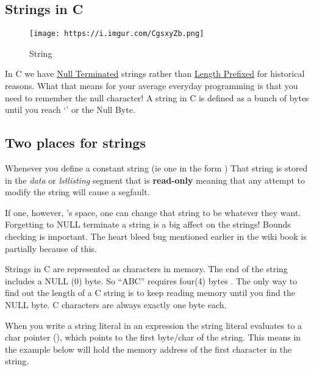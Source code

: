 \subsection{Strings in C}

\begin{figure}[htbp]
\centering
\texttt{[image: https://i.imgur.com/CgsxyZb.png]}
\caption{String}
\end{figure}

In C we have
\href{https://en.wikipedia.org/wiki/Null-terminated_string}{Null
Terminated} strings rather than
\href{https://en.wikipedia.org/wiki/String_(computer_science)\#Length-prefixed}{Length
Prefixed} for historical reasons. What that means for your average
everyday programming is that you need to remember the null character! A
string in C is defined as a bunch of bytes until you reach `\0' or the
Null Byte.

\subsection{Two places for strings}\label{two-places-for-strings}

Whenever you define a constant string (ie one in the form ) That string is stored in the \emph{data} or \emph{lstlisting} segment that is \textbf{read-only} meaning that any attempt to modify the string will cause a segfault.

If one, however, 's space, one can change that string to be whatever they want. Forgetting to NULL terminate a string is a big affect on the strings! Bounds checking is important. The heart bleed bug mentioned earlier in the wiki book is partially because of this.

Strings in C are represented as characters in memory. The end of the string includes a NULL (0) byte. So ``ABC'' requires four(4) bytes .
The only way to find out the length of a C string is to keep reading memory until you find the NULL byte. C characters are always exactly one byte each.

When you write a string literal  in an expression the string literal evaluates to a char pointer (), which points to the first byte/char of the string. This means  in the example below will hold the memory address of the first character in the string.

